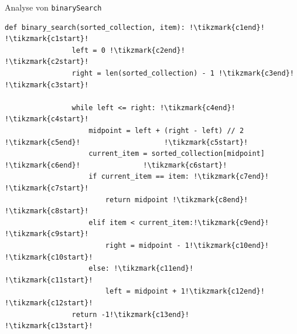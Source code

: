 \begin{frame}[fragile]{Analyse von \texttt{binarySearch}}
    \begin{lstlisting}[escapechar=!, basicstyle=\footnotesize]
            def binary_search(sorted_collection, item): !\tikzmark{c1end}!                      !\tikzmark{c1start}!
                left = 0 !\tikzmark{c2end}!                                                     !\tikzmark{c2start}!
                right = len(sorted_collection) - 1 !\tikzmark{c3end}!                           !\tikzmark{c3start}!

                while left <= right: !\tikzmark{c4end}!                                         !\tikzmark{c4start}!
                    midpoint = left + (right - left) // 2 !\tikzmark{c5end}!                    !\tikzmark{c5start}!
                    current_item = sorted_collection[midpoint] !\tikzmark{c6end}!               !\tikzmark{c6start}!
                    if current_item == item: !\tikzmark{c7end}!                                 !\tikzmark{c7start}!
                        return midpoint !\tikzmark{c8end}!                                      !\tikzmark{c8start}!
                    elif item < current_item:!\tikzmark{c9end}!                                 !\tikzmark{c9start}!
                        right = midpoint - 1!\tikzmark{c10end}!                                 !\tikzmark{c10start}!
                    else: !\tikzmark{c11end}!                                                   !\tikzmark{c11start}!
                        left = midpoint + 1!\tikzmark{c12end}!                                  !\tikzmark{c12start}!
                return -1!\tikzmark{c13end}!                                                    !\tikzmark{c13start}!


\end{lstlisting}
\end{frame}
